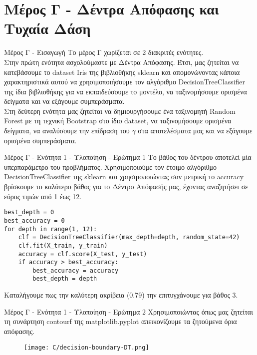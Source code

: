\documentclass{beamer}
\begin{document}
\section{Μέρος Γ - Δέντρα Απόφασης και Τυχαία Δάση}
\begin{frame}{Μέρος Γ - Εισαγωγή}
   Το μέρος Γ χωρίζεται σε 2 διακριτές ενότητες.\\
   Στην πρώτη ενότητα ασχολούμαστε με Δέντρα Απόφασης. Έτσι, μας ζητείται να κατεβάσουμε το dataset Iris της βιβλιοθήκης sklearn και απομονώνοντας κάποια χαρακτηριστικά αυτού να χρησιμοποιήσουμε τον αλγόριθμο DecisionTreeClassifier της ίδια βιβλιοθήκης για να εκπαιδεύσουμε το μοντέλο, να ταξινομήσουμε ορισμένα δείγματα και να εξάγουμε συμπεράσματα.\\
   Στη δεύτερη ενότητα μας ζητείται να δημιουργήσουμε ένα ταξινομητή Random Forest με τη τεχνική Bootstrap στο ίδιο dataset, να ταξινομήσουμε ορισμένα δείγματα, να αναλύσουμε την επίδραση του $\gamma$ στα αποτελέσματα μας και να εξάγουμε ορισμένα συμπεράσματα.
\end{frame}
\begin{frame}[fragile]{Μέρος Γ - Ενότητα 1 - Υλοποίηση - Ερώτημα 1}
Το βάθος του δέντρου αποτελεί μία υπερπαράμετρο του προβλήματος. Χρησιμοποιούμε τον έτοιμο αλγόριθμο DecisionTreeClassifier της sklearn και χρησιμοποιώντας σαν μετρική το accuracy βρίσκουμε το καλύτερο βάθος για το Δέντρο Απόφασής μας, έχοντας αναζητήσει σε εύρος τιμών από 1 έως 12.

\lstset{style=python}
\begin{lstlisting}
best_depth = 0
best_accuracy = 0
for depth in range(1, 12):
    clf = DecisionTreeClassifier(max_depth=depth, random_state=42)
    clf.fit(X_train, y_train)
    accuracy = clf.score(X_test, y_test)
    if accuracy > best_accuracy:
        best_accuracy = accuracy
        best_depth = depth
\end{lstlisting}
Καταλήγουμε πως την καλύτερη ακρίβεια (0.79) την επιτυγχάνουμε για βάθος 3.
\end{frame}
\begin{frame}{Μέρος Γ - Ενότητα 1 - Υλοποίηση - Ερώτημα 2}
Χρησιμοποιώντας όπως μας ζητείται τη συνάρτηση contourf της matplotlib.pyplot απεικονίζουμε τα ζητούμενα όρια απόφασης.
\begin{figure}
    \texttt{[image: C/decision-boundary-DT.png]}   
\end{figure}
\end{frame}
\end{document}
